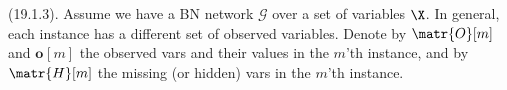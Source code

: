 \documentclass[11pt]{article}
\renewcommand\vec[2][]{\bm{#2}_{#1}}
\newcommand\myspace[1][]{\vspace{#1\bigskipamount}}
\newcommand\p{\Needspace{10\baselineskip} \noindent}
\begin{document}
\myspace \p {} (19.1.3). Assume we have a BN network $\mathcal G$ over a set of variables $\X$. In general, each instance has a different set of observed variables. Denote by $\matr{O}[m]$ and $\vec{o}[m]$ the observed vars and their values in the $m$'th instance, and by $\matr{H}[m]$ the missing (or hidden) vars in the $m$'th instance. 

\end{document}
